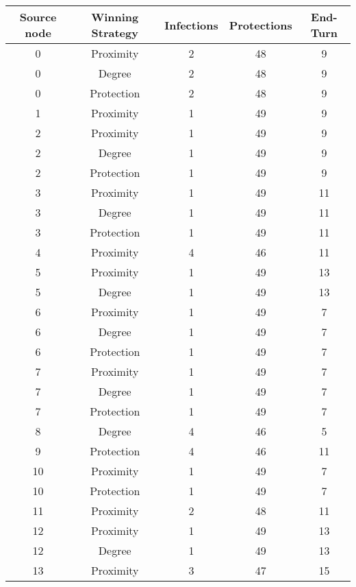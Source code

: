 \documentclass[results.tex]{subfiles}
\begin{document}
\begin{center}
  \begin{tabular}{| c || c | c | c | c |}
    \hline
    {\bfseries Source node} & {\bfseries Winning Strategy} & {\bfseries Infections} & {\bfseries Protections} & {\bfseries End-Turn} \\  %
    \hline\hline
    0 & Proximity & 2 & 48 & 9 \\ 
    \hline
    0 & Degree & 2 & 48 & 9 \\ 
    \hline
    0 & Protection & 2 & 48 & 9 \\ 
    \hline
    1 & Proximity & 1 & 49 & 9 \\ 
    \hline
    2 & Proximity & 1 & 49 & 9 \\ 
    \hline
    2 & Degree & 1 & 49 & 9 \\ 
    \hline
    2 & Protection & 1 & 49 & 9 \\ 
    \hline
    3 & Proximity & 1 & 49 & 11 \\ 
    \hline
    3 & Degree & 1 & 49 & 11 \\ 
    \hline
    3 & Protection & 1 & 49 & 11 \\ 
    \hline
    4 & Proximity & 4 & 46 & 11 \\ 
    \hline
    5 & Proximity & 1 & 49 & 13 \\ 
    \hline
    5 & Degree & 1 & 49 & 13 \\ 
    \hline
    6 & Proximity & 1 & 49 & 7 \\ 
    \hline
    6 & Degree & 1 & 49 & 7 \\ 
    \hline
    6 & Protection & 1 & 49 & 7 \\ 
    \hline
    7 & Proximity & 1 & 49 & 7 \\ 
    \hline
    7 & Degree & 1 & 49 & 7 \\ 
    \hline
    7 & Protection & 1 & 49 & 7 \\ 
    \hline
    8 & Degree & 4 & 46 & 5 \\ 
    \hline
    9 & Protection & 4 & 46 & 11 \\ 
    \hline
    10 & Proximity & 1 & 49 & 7 \\ 
    \hline
    10 & Protection & 1 & 49 & 7 \\ 
    \hline
    11 & Proximity & 2 & 48 & 11 \\ 
    \hline
    12 & Proximity & 1 & 49 & 13 \\ 
    \hline
    12 & Degree & 1 & 49 & 13 \\ 
    \hline
    13 & Proximity & 3 & 47 & 15 \\ 

\end{tabular}
\end{center}
\end{document}
